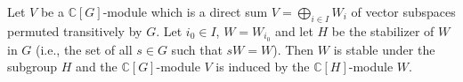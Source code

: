 Let $V$ be a $\mathbb{C}[G]$-module which is a direct sum $V = \bigoplus_{i \in I} W_i$ of vector subspaces permuted transitively by $G$. Let $i_0 \in I$, $W = W_{i_0}$ and let $H$ be the stabilizer of $W$ in $G$ (i.e., the set of all $s \in G$ such that $sW = W$). Then $W$ is stable under the subgroup $H$ and the $\mathbb{C}[G]$-module $V$ is induced by the $\mathbb{C}[H]$-module $W$.
